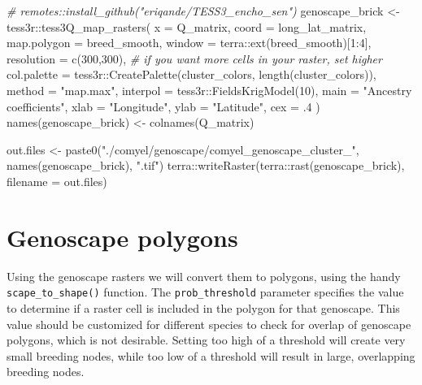 \documentclass[
]{book}
\newenvironment{Shaded}{\begin{snugshade}}{\end{snugshade}}
\newcommand{\AttributeTok}[1]{\textcolor[rgb]{0.77,0.63,0.00}{#1}}
\newcommand{\CommentTok}[1]{\textcolor[rgb]{0.56,0.35,0.01}{\textit{#1}}}
\newcommand{\DecValTok}[1]{\textcolor[rgb]{0.00,0.00,0.81}{#1}}
\newcommand{\FunctionTok}[1]{\textcolor[rgb]{0.00,0.00,0.00}{#1}}
\newcommand{\NormalTok}[1]{#1}
\newcommand{\OtherTok}[1]{\textcolor[rgb]{0.56,0.35,0.01}{#1}}
\newcommand{\SpecialCharTok}[1]{\textcolor[rgb]{0.00,0.00,0.00}{#1}}
\newcommand{\StringTok}[1]{\textcolor[rgb]{0.31,0.60,0.02}{#1}}
\begin{document}
\begin{Shaded}
\begin{Highlighting}[]
\CommentTok{\# remotes::install\_github("eriqande/TESS3\_encho\_sen")}
\NormalTok{genoscape\_brick }\OtherTok{\textless{}{-}}\NormalTok{ tess3r}\SpecialCharTok{::}\FunctionTok{tess3Q\_map\_rasters}\NormalTok{(}
  \AttributeTok{x =}\NormalTok{ Q\_matrix, }
  \AttributeTok{coord =}\NormalTok{ long\_lat\_matrix,  }
  \AttributeTok{map.polygon =}\NormalTok{ breed\_smooth,}
  \AttributeTok{window =}\NormalTok{ terra}\SpecialCharTok{::}\FunctionTok{ext}\NormalTok{(breed\_smooth)[}\DecValTok{1}\SpecialCharTok{:}\DecValTok{4}\NormalTok{],}
  \AttributeTok{resolution =} \FunctionTok{c}\NormalTok{(}\DecValTok{300}\NormalTok{,}\DecValTok{300}\NormalTok{), }\CommentTok{\# if you want more cells in your raster, set higher}
  \AttributeTok{col.palette =}\NormalTok{ tess3r}\SpecialCharTok{::}\FunctionTok{CreatePalette}\NormalTok{(cluster\_colors, }\FunctionTok{length}\NormalTok{(cluster\_colors)), }
  \AttributeTok{method =} \StringTok{"map.max"}\NormalTok{, }
  \AttributeTok{interpol =}\NormalTok{ tess3r}\SpecialCharTok{::}\FunctionTok{FieldsKrigModel}\NormalTok{(}\DecValTok{10}\NormalTok{),  }
  \AttributeTok{main =} \StringTok{"Ancestry coefficients"}\NormalTok{,}
  \AttributeTok{xlab =} \StringTok{"Longitude"}\NormalTok{, }
  \AttributeTok{ylab =} \StringTok{"Latitude"}\NormalTok{, }
  \AttributeTok{cex =}\NormalTok{ .}\DecValTok{4}
\NormalTok{)}
\FunctionTok{names}\NormalTok{(genoscape\_brick) }\OtherTok{\textless{}{-}} \FunctionTok{colnames}\NormalTok{(Q\_matrix)}

\NormalTok{out.files }\OtherTok{\textless{}{-}} \FunctionTok{paste0}\NormalTok{(}\StringTok{"./comyel/genoscape/comyel\_genoscape\_cluster\_"}\NormalTok{, }\FunctionTok{names}\NormalTok{(genoscape\_brick), }\StringTok{".tif"}\NormalTok{)}
\NormalTok{terra}\SpecialCharTok{::}\FunctionTok{writeRaster}\NormalTok{(terra}\SpecialCharTok{::}\FunctionTok{rast}\NormalTok{(genoscape\_brick), }\AttributeTok{filename =}\NormalTok{ out.files)}
\end{Highlighting}
\end{Shaded}

\hypertarget{genoscape-polygons}{%
\section{Genoscape polygons}\label{genoscape-polygons}}

Using the genoscape rasters we will convert them to polygons, using the handy \texttt{scape\_to\_shape()} function. The \texttt{prob\_threshold} parameter specifies the value to determine if a raster cell is included in the polygon for that genoscape. This value should be customized for different species to check for overlap of genoscape polygons, which is not desirable. Setting too high of a threshold will create very small breeding nodes, while too low of a threshold will result in large, overlapping breeding nodes.
\end{document}
